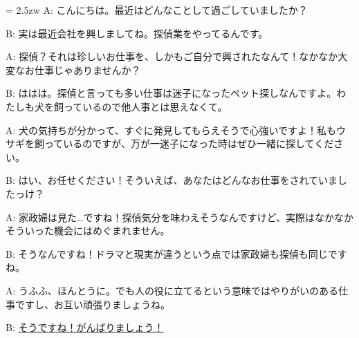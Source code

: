\documentclass[11pt]{amsart}
\title{}
\author{}
\newenvironment{hangall}[1]{\hangindent = 2.5zw\everypar{\hangindent = 2.5zw}}{}
\begin{document}
\maketitle
\begin{hangall}{}%
A: こんにちは。最近はどんなことして過ごしていましたか？

B: 実は最近会社を興しましてね。探偵業をやってるんです。

A: 探偵？それは珍しいお仕事を、しかもご自分で興されたなんて！なかなか大変なお仕事じゃありませんか？

B: ははは。探偵と言っても多い仕事は迷子になったペット探しなんですよ。わたしも犬を飼っているので他人事とは思えなくて。

A: 犬の気持ちが分かって、すぐに発見してもらえそうで心強いですよ！私もウサギを飼っているのですが、万が一迷子になった時はぜひ一緒に探してください。

B: はい、お任せください！そういえば、あなたはどんなお仕事をされていましたっけ？

A: 家政婦は見た…ですね！探偵気分を味わえそうなんですけど、実際はなかなかそういった機会にはめぐまれません。

B: そうなんですね！ドラマと現実が違うという点では家政婦も探偵も同じですね。

A: うふふ、ほんとうに。でも人の役に立てるという意味ではやりがいのある仕事ですし、お互い頑張りましょうね。

B: \ul{そうですね！がんばりましょう！}\end{hangall}
\end{document}
